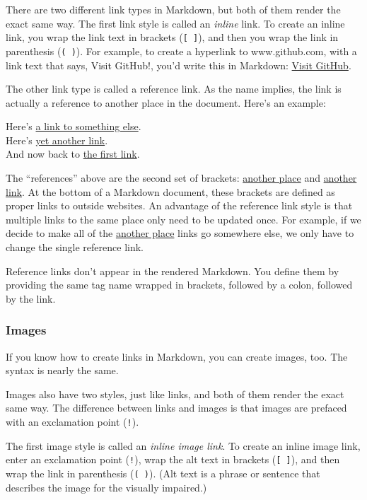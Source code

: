 \documentclass[
]{article}
\begin{document}
There are two different link types in Markdown, but both of them render
the exact same way. The first link style is called an \emph{inline}
link. To create an inline link, you wrap the link text in brackets
(\texttt{{[}\ {]}}), and then you wrap the link in parenthesis
(\texttt{(\ )}). For example, to create a hyperlink to www.github.com,
with a link text that says, Visit GitHub!, you'd write this in Markdown:
\href{https://github.com/}{Visit GitHub}.

The other link type is called a reference link. As the name implies, the
link is actually a reference to another place in the document. Here's an
example:

Here's \href{https://github.com/}{a link to something else}.\\
Here's \href{https://www.google.com/}{yet another link}.\\
And now back to \href{https://github.com/}{the first link}.

The ``references'' above are the second set of brackets:
\href{https://github.com/}{another place} and
\href{https://www.google.com/}{another link}. At the bottom of a
Markdown document, these brackets are defined as proper links to outside
websites. An advantage of the reference link style is that multiple
links to the same place only need to be updated once. For example, if we
decide to make all of the \href{https://github.com/}{another place}
links go somewhere else, we only have to change the single reference
link.

Reference links don't appear in the rendered Markdown. You define them
by providing the same tag name wrapped in brackets, followed by a colon,
followed by the link.

\hypertarget{images}{%
\subsubsection{Images}\label{images}}

If you know how to create links in Markdown, you can create images, too.
The syntax is nearly the same.

Images also have two styles, just like links, and both of them render
the exact same way. The difference between links and images is that
images are prefaced with an exclamation point (\texttt{!}).

The first image style is called an \emph{inline image link}. To create
an inline image link, enter an exclamation point (\texttt{!}), wrap the
alt text in brackets (\texttt{{[}\ {]}}), and then wrap the link in
parenthesis (\texttt{(\ )}). (Alt text is a phrase or sentence that
describes the image for the visually impaired.)
\end{document}

